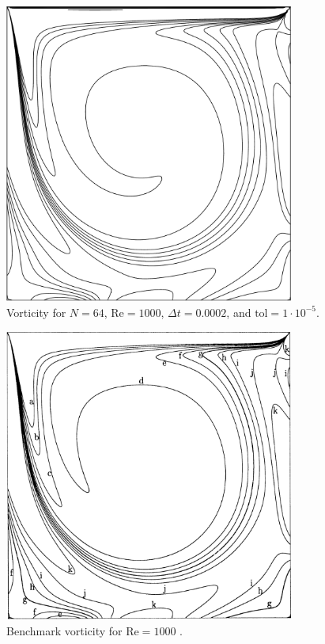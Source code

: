 \begin{figure}[p]
    \centering
    \includegraphics[width=0.85\textwidth]{Images/vorticity.pdf}
    \caption{Vorticity for $N = 64$, $\text{Re} = 1000$, $\Delta t = 0.0002$, and $\text{tol} = 1 \cdot 10^{-5}$.}
    \label{fig:VN64}
\end{figure}

\begin{figure}[p]
    \centering
    \includegraphics[width=0.85\textwidth]{Images/vorticity.png}
    \caption{Benchmark vorticity for $\text{Re} = 1000$ \parencite{botella1998benchmark}.}
    \label{fig:benchmarkVN64}
\end{figure}

